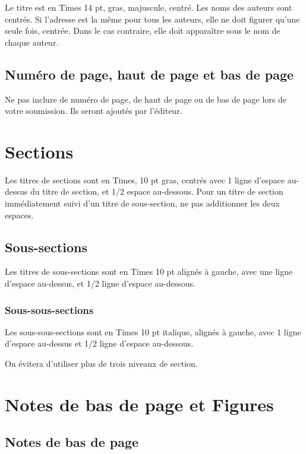 \documentclass{article}
\begin{document}
Le titre est en Times 14 pt, gras, majuscule, centré. Les noms des auteurs sont centrés. Si l'adresse est la même pour tous les auteurs, elle ne doit figurer qu'une seule fois, centrée. Dans le cas contraire, elle doit apparaître sous le nom de chaque auteur.

\subsection{Numéro de page, haut de page et  bas de page}

Ne pas inclure  de numéro de page, de haut de page ou de bas de page lors de votre soumission. Ils seront ajoutés par l'éditeur.

\section{Sections}

Les titres de sections sont en Times, 10 pt gras, centrés avec 1 ligne d'espace au-dessus du titre de section, et 1/2 espace au-dessous. Pour un titre de section immédiatement suivi d'un titre de sous-section, ne pas additionner les deux espaces.

\subsection{Sous-sections}

Les titres de sous-sections sont en Times 10 pt alignés à gauche, avec une ligne d'espace au-dessus, et 1/2 ligne d'espace au-dessous.

\subsubsection{Sous-sous-sections}

Les sous-sous-sections sont en Times 10 pt italique, alignés à gauche, avec 1 ligne d'espace au-dessus et 1/2 ligne d'espace au-dessous.

On évitera d'utiliser plus de trois niveaux de section.


\section{Notes de bas de page et Figures}

\subsection{Notes de bas de page}
\end{document}
